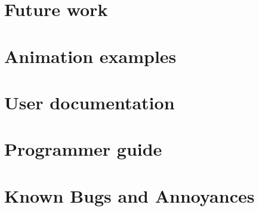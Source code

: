 \documentclass{article}
\begin{document}






\section{Future work}







\clearpage

\appendix

\section{Animation examples}
\label{sec:animations}


\clearpage

\section{User documentation}
\label{sec:user_documentation}


\clearpage

\section{Programmer guide}
\label{sec:programmer_guide}


\clearpage

\section{Known Bugs and Annoyances}
\label{sec:bugs}

\end{document}
